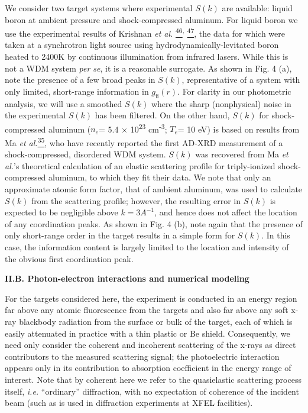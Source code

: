 We consider two target systems where experimental \(S(k)\) are
available: liquid boron at ambient pressure and shock-compressed
aluminum. For liquid boron we use the experimental results of Krishnan
\emph{et al.}
\hyperref[s.-krishnan-s.-ansell-j.-j.-felten-k.-j.-volin-and-d.-l.-price-physical-review-letters-81-586-1998.]{\textsuperscript{46}}\textsuperscript{,}
\hyperref[s.-krishnan-and-d.-l.-price-journal-of-physics-condensed-matter-12-r145-2000.]{\textsuperscript{47}},
the data for which were taken at a synchrotron light source using
hydrodynamically-levitated boron heated to 2400K by continuous
illumination from infrared lasers. While this is not a WDM system
\emph{per se}, it is a reasonable surrogate. As shown in Fig. 4 (a),
note the presence of a few broad peaks in \(S(k)\), representative of a
system with only limited, short-range information in
\(g_{\text{ii}}\left( r \right)\). For clarity in our photometric
analysis, we will use a smoothed \(S(k)\) where the sharp (nonphysical)
noise in the experimental \(S(k)\) has been filtered. On the other hand,
\(S(k)\) for shock-compressed aluminum (\(n_{e}\)= 5.4 ×
10\textsuperscript{23} cm\textsuperscript{-3}; \(T_{e}\)= 10 eV) is
based on results from Ma \emph{et
al.}\hyperref[t.-ma-et-al.-physical-review-letters-110-065001-2013.]{\textsuperscript{35}},
who have recently reported the first AD-XRD measurement of a
shock-compressed, disordered WDM system. \(S(k)\) was recovered from Ma
\emph{et al.}'s theoretical calculation of an elastic scattering profile
for triply-ionized shock-compressed aluminum, to which they fit their
data. We note that only an approximate atomic form factor, that of
ambient aluminum, was used to calculate \(S(k)\) from the scattering
profile; however, the resulting error in \(S(k)\) is expected to be
negligible above \(k = 3A^{- 1}\), and hence does not affect the
location of any coordination peaks. As shown in Fig. 4 (b), note again
that the presence of only short-range order in the target results in a
simple form for \(S(k)\). In this case, the information content is
largely limited to the location and intensity of the obvious first
coordination peak.

\textbf{II.B. Photon-electron interactions and numerical modeling }

For the targets considered here, the experiment is conducted in an
energy region far above any atomic fluorescence from the targets and
also far above any soft x-ray blackbody radiation from the surface or
bulk of the target, each of which is easily attenuated in practice with
a thin plastic or Be shield. Consequently, we need only consider the
coherent and incoherent scattering of the x-rays as direct contributors
to the measured scattering signal; the photoelectric interaction appears
only in its contribution to absorption coefficient in the energy range
of interest. Note that by coherent here we refer to the quasielastic
scattering process itself, \emph{i.e.} ``ordinary'' diffraction, with no
expectation of coherence of the incident beam (such as is used in
diffraction experiments at XFEL facilities).

